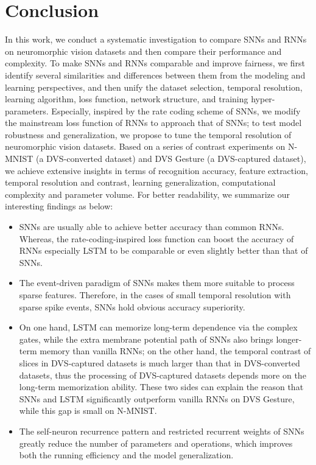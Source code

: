 \documentclass[journal,10pt,twocolumn]{IEEETran}
\begin{document}
 \section{Conclusion}\label{sec:conclusion}

In this work, we conduct a systematic investigation to compare SNNs and RNNs on neuromorphic vision datasets and then compare their performance and complexity. To make SNNs and RNNs comparable and improve fairness, we first identify several similarities and differences between them from the modeling and learning perspectives, and then unify the dataset selection, temporal resolution, learning algorithm, loss function, network structure, and training hyper-parameters. Especially, inspired by the rate coding scheme of SNNs, we modify the mainstream loss function of RNNs to approach that of SNNs; to test model robustness and generalization, we propose to tune the temporal resolution of neuromorphic vision datasets. Based on a series of contrast experiments on N-MNIST (a DVS-converted dataset) and DVS Gesture (a DVS-captured dataset), we achieve extensive insights in terms of recognition accuracy, feature extraction, temporal resolution and contrast, learning generalization, computational complexity and parameter volume. For better readability, we summarize our interesting findings as below:
\begin{itemize}
\item SNNs are usually able to achieve better accuracy than common RNNs. Whereas, the rate-coding-inspired loss function can boost the accuracy of RNNs especially LSTM to be comparable or even slightly better than that of SNNs.

\item The event-driven paradigm of SNNs makes them more suitable to process sparse features. Therefore, in the cases of small temporal resolution with sparse spike events, SNNs hold obvious accuracy superiority.

\item On one hand, LSTM can memorize long-term dependence via the complex gates, while the extra membrane potential path of SNNs also brings longer-term memory than vanilla RNNs; on the other hand, the temporal contrast of slices in DVS-captured datasets is much larger than that in DVS-converted datasets, thus the processing of DVS-captured datasets depends more on the long-term memorization ability. These two sides can explain the reason that SNNs and LSTM significantly outperform vanilla RNNs on DVS Gesture, while this gap is small on N-MNIST.

\item The self-neuron recurrence pattern and restricted recurrent weights of SNNs greatly reduce the number of parameters and operations, which improves both the running efficiency and the model generalization. 
\end{itemize}
\end{document}
